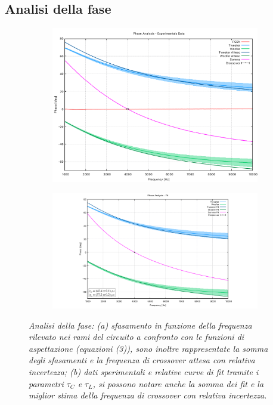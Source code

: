 \documentclass[12pt]{article}
\begin{document}
\subsection{Analisi della fase}
\begin{figure}[!ht]
  \begin{subfigure}{.5\textwidth}
    \centering
    \includegraphics[width=1\linewidth]{../results/CFPhase.pdf}
    \caption{\textit{}}
  \end{subfigure}%
  \hfill
  \begin{subfigure}{.5\textwidth}
    \centering
    \includegraphics[width=1\linewidth]{../results/CFPhaseFit.pdf}
    \caption{\textit{}}
  \end{subfigure}
  \caption{ \textit{Analisi della fase: (a) sfasamento in funzione della frequenza rilevato nei rami del circuito 
  a confronto con le funzioni di aspettazione (equazioni (3)), sono inoltre rappresentate la somma degli sfasamenti e la frequenza 
  di crossover attesa con relativa incertezza; (b) dati sperimentali e relative curve di fit tramite i parametri $\tau_C$ e $\tau_L$, 
  si possono notare anche la somma dei fit e la miglior stima della frequenza di crossover con relativa incertezza.}}
  \end{figure}
\end{document}
